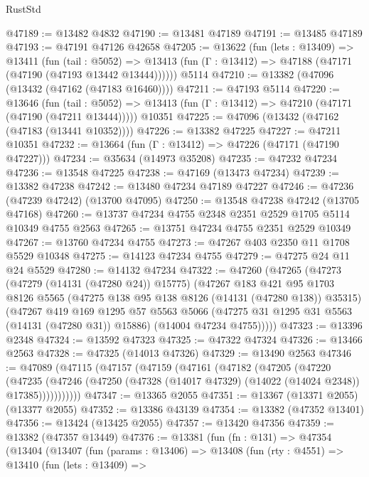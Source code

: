 \begin{lexlean}{RustStd}
\begin{coremodule}
@47189 := @13482 @4832
@47190 := @13481 @47189
@47191 := @13485 @47189
@47193 := @47191 @47126 @42658
@47205 := @13622
    (fun (lets : @13409) =>
    @13411
      (fun (tail : @5052) =>
      @13413 (fun (Γ : @13412) => @47188 (@47171 (@47190 (@47193 @13442 @13444))))))
    @5114
@47210 := @13382 (@47096 (@13432 (@47162 (@47183 @16460))))
@47211 := @47193 @5114
@47220 := @13646
    (fun (tail : @5052) => @13413 (fun (Γ : @13412) => @47210 (@47171 (@47190 (@47211 @13444)))))
    @10351
@47225 := @47096 (@13432 (@47162 (@47183 (@13441 @10352))))
@47226 := @13382 @47225
@47227 := @47211 @10351
@47232 := @13664 (fun (Γ : @13412) => @47226 (@47171 (@47190 @47227)))
@47234 := @35634 (@14973 @35208)
@47235 := @47232 @47234
@47236 := @13548 @47225
@47238 := @47169 (@13473 @47234)
@47239 := @13382 @47238
@47242 := @13480 @47234 @47189 @47227
@47246 := @47236 (@47239 @47242) (@13700 @47095)
@47250 := @13548 @47238 @47242 (@13705 @47168)
@47260 := @13737 @47234 @4755 @2348 @2351 @2529 @1705 @5114 @10349 @4755 @2563
@47265 := @13751 @47234 @4755 @2351 @2529 @10349
@47267 := @13760 @47234 @4755
@47273 := @47267 @403 @2350 @11 @1708 @5529 @10348
@47275 := @14123 @47234 @4755
@47279 := @47275 @24 @11 @24 @5529
@47280 := @14132 @47234
@47322 := @47260
    (@47265
      (@47273
        (@47279 (@14131 (@47280 @24)) @15775)
        (@47267
          @183
          @421
          @95
          @1703
          @8126
          @5565
          (@47275 @138 @95 @138 @8126 (@14131 (@47280 @138)) @35315)
          (@47267
            @419
            @169
            @1295
            @57
            @5563
            @5066
            (@47275 @31 @1295 @31 @5563 (@14131 (@47280 @31)) @15886)
            (@14004 @47234 @4755)))))
@47323 := @13396 @2348
@47324 := @13592 @47323
@47325 := @47322 @47324
@47326 := @13466 @2563
@47328 := @47325 (@14013 @47326)
@47329 := @13490 @2563
@47346 := @47089
    (@47115
      (@47157
        (@47159
          (@47161
            (@47182
              (@47205
                (@47220
                  (@47235
                    (@47246
                      (@47250 (@47328 (@14017 @47329) (@14022 (@14024 @2348)) @17385)))))))))))
@47347 := @13365 @2055
@47351 := @13367 (@13371 @2055) (@13377 @2055)
@47352 := @13386 @43139
@47354 := @13382 (@47352 @13401)
@47356 := @13424 (@13425 @2055)
@47357 := @13420 @47356
@47359 := @13382 (@47357 @13449)
@47376 := @13381
    (fun (fn : @131) =>
    @47354
      (@13404
        (@13407
          (fun (params : @13406) =>
          @13408
            (fun (rty : @4551) =>
            @13410
              (fun (lets : @13409) =>

\end{coremodule}
\end{lexlean}
